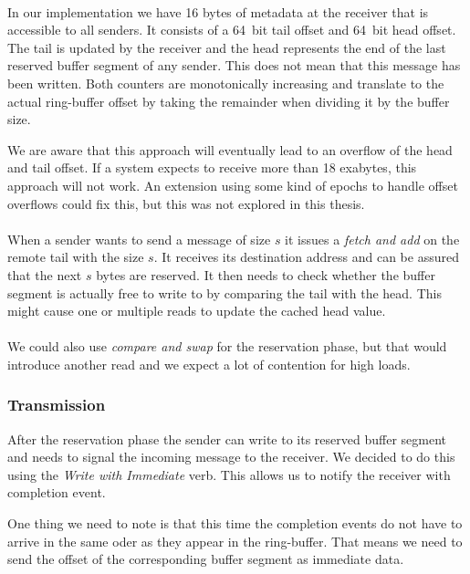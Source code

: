 \paragraph{} In our implementation we have 16 bytes of metadata at the receiver that is accessible to all senders. It consists
of a 64~bit tail offset and 64~bit head offset. The tail is updated by the receiver and the head represents the end of the
last reserved buffer segment of any sender. This does not mean that this message has been written. Both counters are
monotonically increasing and translate to the actual ring-buffer offset by taking the remainder when dividing it by
the buffer size.

We are aware that this approach will eventually lead to an overflow of the head and tail offset. If a system expects to receive
more than 18 exabytes, this approach will not work. An extension using some kind of epochs to handle offset overflows could
fix this, but this was not explored in this thesis.

\paragraph{}When a sender wants to send a message of size $s$ it issues a \emph{fetch and add} on the remote tail with the 
size $s$. It receives its destination address and can be assured that the next $s$ bytes are reserved. It then needs
to check whether the buffer segment is actually free to write to by comparing the tail with the head. This might cause one 
or multiple reads to update the cached head value.

\paragraph{} We could also use \emph{compare and swap} for the reservation phase, but that would introduce another read and
we expect a lot of contention for high loads.

\subsubsection{Transmission}
After the reservation phase the sender can write to its reserved buffer segment and needs to signal the incoming message
to the receiver. We decided to do this using the \emph{Write with Immediate} verb. This allows us to notify the receiver 
with completion event. 

One thing we need to note is that this time the completion events do not have to arrive in the same oder as they appear in
the ring-buffer. That means we need to send the offset of the corresponding buffer segment as immediate data.


